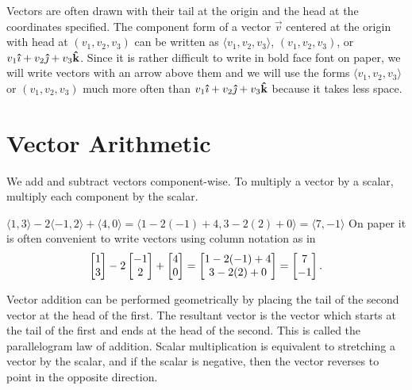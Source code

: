 Vectors are often drawn with their tail at the origin and the head at
the coordinates specified. The component form of a vector $\vec v$
centered at the origin with head at $(v_1,v_2,v_3)$ can be written
as $\langle v_1,v_2,v_3\rangle$, $(v_1,v_2,v_3)$, or $v_1\mathbf{\hat \imath}+v_2\mathbf{\hat \jmath}+v_3\mathbf{\hat k}$. Since it is rather
difficult to write in bold face font on paper, we will write vectors
with an arrow above them and we will use the forms $\langle
v_1,v_2,v_3\rangle$ or $(v_1,v_2,v_3)$ much
more often than $v_1\mathbf{\hat \imath}+v_2\mathbf{\hat \jmath}+v_3\mathbf{\hat k}$ because it takes less space.

		
\section{Vector Arithmetic}
We add and subtract vectors component-wise. To multiply a vector by a
scalar, multiply each component by the scalar.  
\begin{example}
$\langle1,3\rangle-2\langle-1,2\rangle+\langle4,0\rangle = \langle1-2(-1)+4,3-2(2)+0\rangle = \langle7,-1\rangle$  
On paper it is often convenient to write vectors using column notation
as in
$$\begin{bmatrix}1\\3\end{bmatrix}-2\begin{bmatrix}-1\\  2\end{bmatrix} + \begin{bmatrix}4\\0\end{bmatrix} 
= \begin{bmatrix}1-2(-1)+4\\3-2(2)+0\end{bmatrix} = \begin{bmatrix}7\\-1\end{bmatrix}.$$ 
\end{example}
Vector addition can be performed geometrically by placing the tail of
the second vector at the head of the first. The resultant vector is
the vector which starts at the tail of the first and ends at the head
of the second. This is called the parallelogram law of
addition. Scalar multiplication is equivalent to stretching a vector
by the scalar, and if the scalar is negative, then the vector reverses
to point in the opposite direction.

